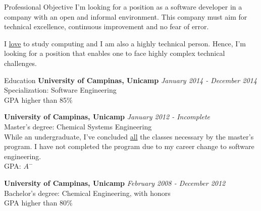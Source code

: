 \documentclass{resume} %
\begin{document}
\begin{rSection}{Professional Objective}
  I'm looking for a position as a software developer in a company with an
  open and informal environment. This company must aim for technical excellence,
  continuous improvement and no fear of error.

  I \underline{love} to study computing and I am also a highly technical person.
  Hence, I'm looking for a position that enables one to face highly complex
  technical challenges.
\end{rSection}

\begin{rSection}{Education}
  {\bf University of Campinas, Unicamp} \hfill {\em January 2014 - December 2014} \\
  Specialization: Software Engineering \\
  GPA higher than 85\%

  {\bf University of Campinas, Unicamp} \hfill {\em January 2012 - Incomplete} \\
  Master's degree: Chemical Systems Engineering \\
  While an undergraduate, I've concluded \underline{all} the classes necessary by
  the master's program. I have not completed the program due to my career change
  to software engineering. \\
  GPA: $A^-$

  {\bf University of Campinas, Unicamp} \hfill {\em February 2008 - December 2012} \\
  Bachelor's degree: Chemical Engineering, with honors \\
  GPA higher than 80\%
\end{rSection}
\end{document}
